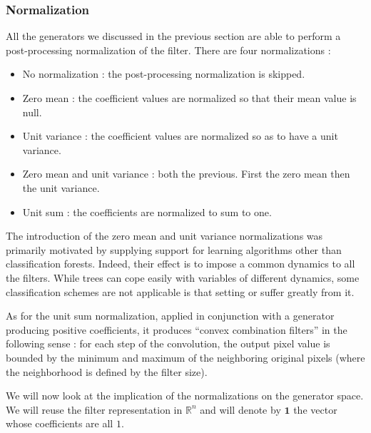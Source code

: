 \documentclass[a4paper]{report}
\begin{document}
			
			\subsubsection{Normalization}
			All the generators we discussed in the previous section are able to perform a post-processing normalization of the filter. There are four normalizations :
			
			\begin{itemize}
				\item No normalization : the post-processing normalization is skipped.
				\item Zero mean : the coefficient values are normalized so that their mean value is null.
				\item Unit variance : the coefficient values are normalized so as to have a unit variance.
				\item Zero mean and unit variance : both the previous. First the zero mean then the unit variance.
				\item Unit sum : the coefficients are normalized to sum to one.
			\end{itemize}
			
			The introduction of the zero mean and unit variance normalizations was primarily motivated by supplying support for learning algorithms other than classification forests. Indeed, their effect is to impose a common dynamics to all the filters. While trees can cope easily with variables of different dynamics, some classification schemes are not applicable is that setting or suffer greatly from it.
			\par
			As for the unit sum normalization, applied in conjunction with a generator producing positive coefficients, it produces ``convex combination filters'' in the following sense : for each step of the convolution, the output pixel value is bounded by the minimum and maximum of the neighboring original pixels (where the neighborhood is defined by the filter size).
			\par
			We will now look at the implication of the normalizations on the generator space. We will reuse the filter representation in $\mathbb{R}^n$ and will denote by $\textbf{1}$ the vector whose coefficients are all $1$.
			
\end{document}
